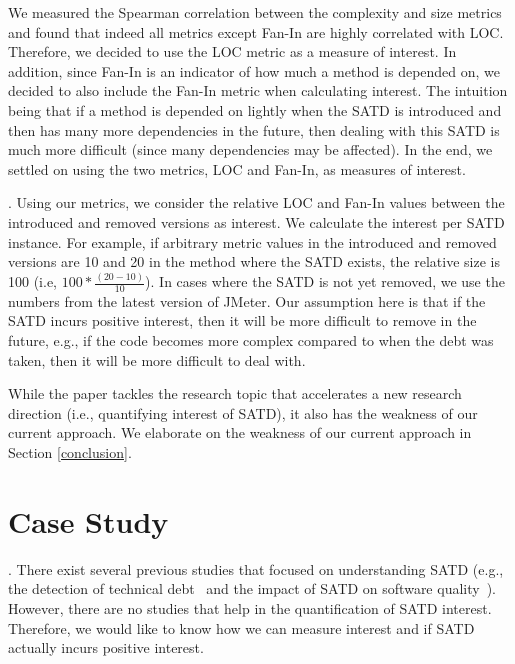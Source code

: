 \documentclass[10pt, conference]{IEEEtran}
\newcommand{\smallsection}[1]{\vspace{1mm}\noindent {\bf #1}.\hspace{2mm}}
\begin{document}
We measured the Spearman correlation between the complexity and size metrics and found that indeed all metrics except Fan-In are highly correlated with LOC. Therefore, we decided to use the LOC metric as a measure of interest. In addition, since Fan-In is an indicator of how much a method is depended on, we decided to also include the Fan-In metric when calculating interest. The intuition being that if a method is depended on lightly when the SATD is introduced and then has many more dependencies in the future, then dealing with this SATD is much more difficult (since many dependencies may be affected). In the end, we settled on using the two metrics, LOC and Fan-In, as measures of interest.


\smallsection{4. Calculating Interest}
Using our metrics, we consider the relative LOC and Fan-In values between the introduced and removed versions as interest. We calculate the interest per SATD instance. For example, if arbitrary metric values in the introduced and removed versions are 10 and 20 in the method where the SATD exists, the relative size is 100 (i.e, $100* \frac{(20-10)}{10}$). In cases where the SATD is not yet removed, we use the numbers from the latest version of JMeter. Our assumption here is that if the SATD incurs positive interest, then it will be more difficult to remove in the future, e.g., if the code becomes more complex compared to when the debt was taken, then it will be more difficult to deal with.

While the paper tackles the research topic that accelerates a new research direction (i.e., quantifying interest of SATD), it also has the weakness of our current approach. We elaborate on the weakness of our current approach in Section \ref{conclusion}.


\section{Case Study} \label{sec:results}
\smallsection{Motivation}
There exist several previous studies that focused on understanding SATD (e.g., the detection of technical debt~\cite{Potdar2014ICSME,Zazworka2013EASE} and the impact of SATD on software quality~\cite{Wehaibi2016SANER}). However, there are no studies that help in the quantification of SATD interest. Therefore, we would like to know how we can measure interest and if SATD actually incurs positive interest.
\end{document}
